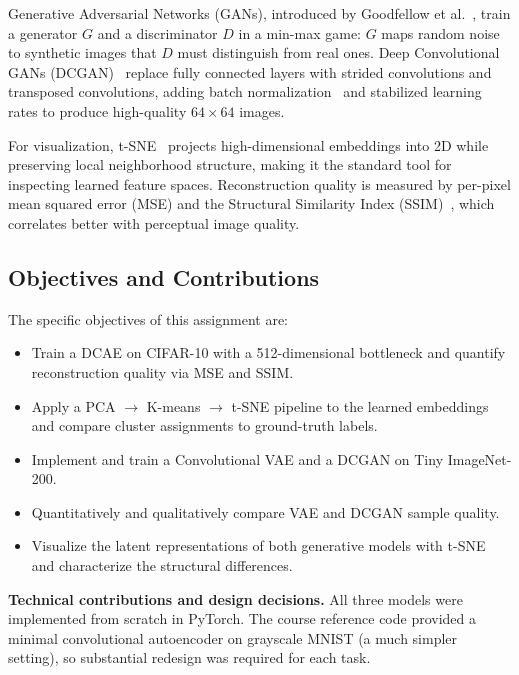\documentclass[12pt]{article}
\begin{document}
Generative Adversarial Networks (GANs), introduced by Goodfellow et al.~\cite{gan2014}, train a generator $G$ and a discriminator $D$ in a min-max game: $G$ maps random noise to synthetic images that $D$ must distinguish from real ones. Deep Convolutional GANs (DCGAN)~\cite{dcgan2015} replace fully connected layers with strided convolutions and transposed convolutions, adding batch normalization~\cite{batchnorm2015} and stabilized learning rates to produce high-quality $64\times64$ images.

For visualization, t-SNE~\cite{tsne2008} projects high-dimensional embeddings into 2D while preserving local neighborhood structure, making it the standard tool for inspecting learned feature spaces. Reconstruction quality is measured by per-pixel mean squared error (MSE) and the Structural Similarity Index (SSIM)~\cite{ssim2004}, which correlates better with perceptual image quality.

\subsection{Objectives and Contributions}

The specific objectives of this assignment are:
\begin{itemize}
    \item Train a DCAE on CIFAR-10 with a 512-dimensional bottleneck and quantify reconstruction quality via MSE and SSIM.
    \item Apply a PCA $\rightarrow$ K-means $\rightarrow$ t-SNE pipeline to the learned embeddings and compare cluster assignments to ground-truth labels.
    \item Implement and train a Convolutional VAE and a DCGAN on Tiny ImageNet-200.
    \item Quantitatively and qualitatively compare VAE and DCGAN sample quality.
    \item Visualize the latent representations of both generative models with t-SNE and characterize the structural differences.
\end{itemize}

\noindent\textbf{Technical contributions and design decisions.}
All three models were implemented from scratch in PyTorch. The course reference code provided a minimal convolutional autoencoder on grayscale MNIST (a much simpler setting), so substantial redesign was required for each task.
\end{document}
